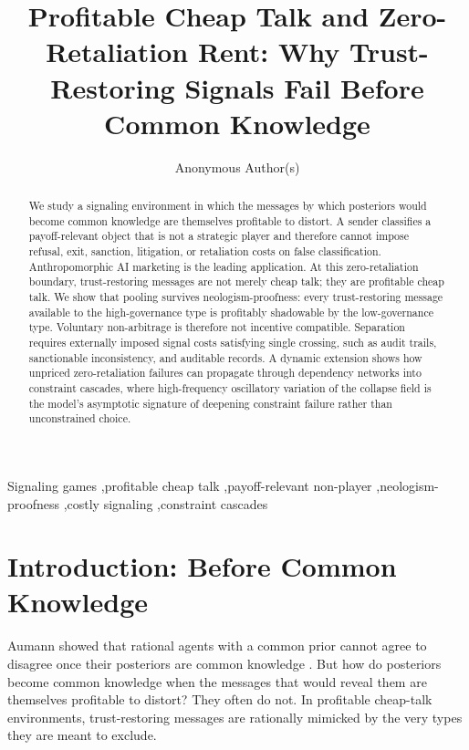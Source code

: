 \documentclass[review,authoryear]{elsarticle}
\theoremstyle{definition}
\theoremstyle{plain}
\begin{document}
\begin{frontmatter}

\title{Profitable Cheap Talk and Zero-Retaliation Rent: Why Trust-Restoring Signals Fail Before Common Knowledge}

\author{Anonymous Author(s)}
\address{Submission \#XXX, USA}

\begin{abstract}
We study a signaling environment in which the messages by which posteriors would become common knowledge are themselves profitable to distort. A sender classifies a payoff-relevant object that is not a strategic player and therefore cannot impose refusal, exit, sanction, litigation, or retaliation costs on false classification. Anthropomorphic AI marketing is the leading application. At this zero-retaliation boundary, trust-restoring messages are not merely cheap talk; they are profitable cheap talk. We show that pooling survives neologism-proofness: every trust-restoring message available to the high-governance type is profitably shadowable by the low-governance type. Voluntary non-arbitrage is therefore not incentive compatible. Separation requires externally imposed signal costs satisfying single crossing, such as audit trails, sanctionable inconsistency, and auditable records. A dynamic extension shows how unpriced zero-retaliation failures can propagate through dependency networks into constraint cascades, where high-frequency oscillatory variation of the collapse field is the model's asymptotic signature of deepening constraint failure rather than unconstrained choice.
\end{abstract}

\begin{keyword}
Signaling games \sep profitable cheap talk \sep payoff-relevant non-player \sep neologism-proofness \sep costly signaling \sep constraint cascades
\end{keyword}

\end{frontmatter}

\section{Introduction: Before Common Knowledge}
\label{sec:introduction}

Aumann showed that rational agents with a common prior cannot agree to disagree once their posteriors are common knowledge \citep{aumann1976agreeing}. But how do posteriors become common knowledge when the messages that would reveal them are themselves profitable to distort? They often do not. In profitable cheap-talk environments, trust-restoring messages are rationally mimicked by the very types they are meant to exclude.
\end{document}
